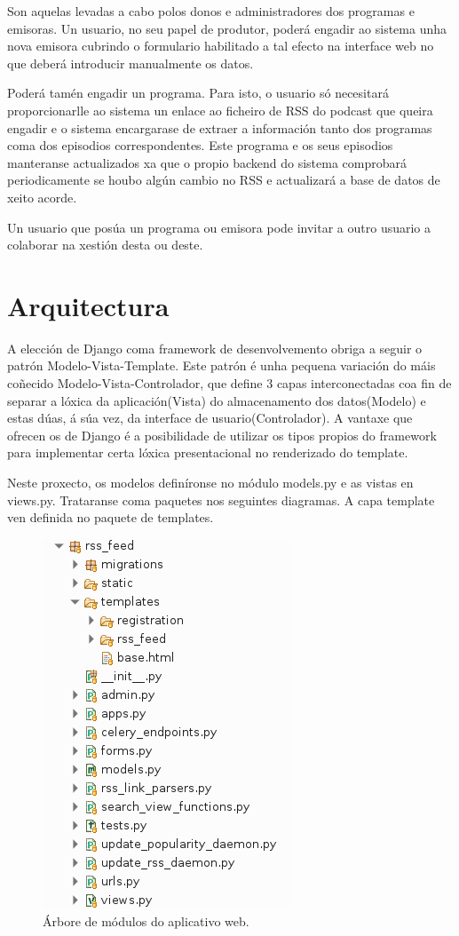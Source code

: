 Son aquelas levadas a cabo polos donos e administradores dos programas e emisoras. Un usuario, no seu papel de produtor, poderá engadir ao sistema unha nova emisora cubrindo o formulario habilitado a tal efecto na interface web no que deberá introducir manualmente os datos.

Poderá tamén engadir un programa. Para isto, o usuario só necesitará proporcionarlle ao sistema un enlace ao ficheiro de RSS do podcast que queira engadir e o sistema encargarase de extraer a información tanto dos programas coma dos episodios correspondentes. Este programa e os seus episodios manteranse actualizados xa que o propio backend do sistema comprobará periodicamente se houbo algún cambio no RSS e actualizará a base de datos de xeito acorde.  

Un usuario que posúa un programa ou emisora pode invitar a outro usuario a colaborar na xestión desta ou deste.

\section{Arquitectura}

A elección de Django coma framework de desenvolvemento obriga a seguir o patrón Modelo-Vista-Template. Este patrón é unha pequena variación do máis coñecido Modelo-Vista-Controlador, que define 3 capas interconectadas coa fin de separar a lóxica da aplicación(Vista) do almacenamento dos datos(Modelo) e estas dúas, á súa vez, da interface de usuario(Controlador). A vantaxe que ofrecen os  de Django é a posibilidade de utilizar os tipos propios do framework para implementar certa lóxica presentacional no renderizado do template.

Neste proxecto, os modelos  definíronse no módulo models.py e as vistas en views.py. Trataranse coma paquetes nos seguintes diagramas. A capa template ven definida no paquete de templates.

\begin{figure}[h]
	\centering
	\includegraphics[scale=0.6,keepaspectratio=true]{./images/project_tree.png}
	\caption{Árbore de módulos do aplicativo web.}
	\label{fig:project_tree}
\end{figure}


